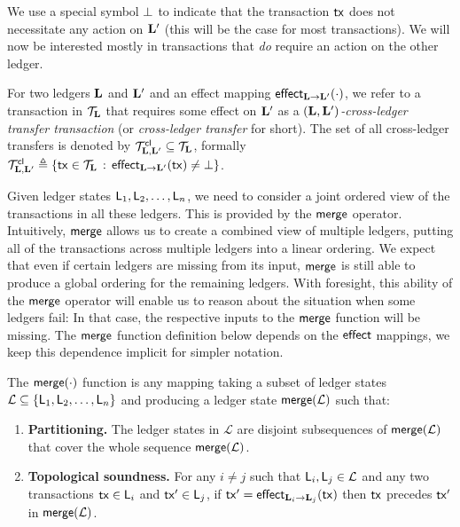 We use a special symbol $\noeffect$ to indicate that the transaction $\tx$ does
not necessitate any action on $\Ledger'$ (this will be the case for most
transactions).
We will now be interested mostly in transactions that \emph{do}
require an action on the other ledger.

\begin{definition}
For two ledgers $\Ledger$ and $\Ledger'$ and an effect mapping
$\eff{\Ledger}{\Ledger'}(\cdot)$, we refer to a transaction in
$\Trans_\Ledger$ that requires some effect on $\Ledger'$ as
a \emph{$(\Ledger,\Ledger')$-cross-ledger transfer
transaction} (or \emph{cross-ledger transfer} for short).
The set of all cross-ledger transfers is denoted by
  $\Trans_{\Ledger,\Ledger'}^\cl\subseteq\Trans_\Ledger$,
formally
$
  \Trans_{\Ledger,\Ledger'}^\cl
\defeq
\setd
  {\tx \in \Trans_\Ledger}
  {\eff{\Ledger}{\Ledger'}(\tx)\neq\noeffect}
$.
\end{definition}

Given ledger states $\LState_1, \LState_2, \ldots,\LState_n$, we need to
consider a joint ordered view of the transactions in all these ledgers. This is provided
by the  $\merge$ operator. Intuitively, $\merge$  allows us to
create a combined view of multiple ledgers, putting all of the transactions
across multiple ledgers into a linear ordering.
We expect that even if certain ledgers are missing from its input,
$\merge$ is still able to produce a global ordering for the remaining ledgers.
With foresight, this ability of the $\merge$ operator will enable us to reason
about the
situation
when some ledgers fail: In that case, the respective
inputs to the $\merge$ function will be missing. The $\merge$ function
definition below depends on the $\effect$ mappings, we keep this dependence
implicit for simpler notation.

\begin{definition}
  \label{def:merge}
  The $\merge(\cdot)$ function is any mapping taking a
  subset of ledger states $\mathcal{L} \subseteq
  \{\LState_1,\LState_2,\ldots,\LState_n\}$
  and producing a ledger state $\merge(\mathcal{L})$
  such that:
  \begin{enumerate}
    \item \textbf{Partitioning.}
      The ledger states in $\mathcal{L}$ are disjoint subsequences of
      $\merge(\mathcal{L})$ that cover the whole sequence $\merge(\mathcal{L})$.
    \item \textbf{Topological soundness.}
      For any $i\neq j$ such that $\LState_i,\LState_j\in\mathcal{L}$
      and any two transactions $\tx \in
      \LState_i$ and $\tx' \in \LState_j$,
      if $\tx' = \eff{\Ledger_i}{\Ledger_j}(\tx)$
      then $\tx$ precedes $\tx'$ in $\merge(\mathcal{L})$.
  \end{enumerate}
\end{definition}

